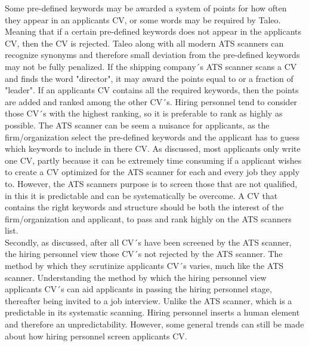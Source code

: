 Some pre-defined keywords may be awarded a system of points for how often they appear in an applicants CV, or some words may be required by Taleo.
Meaning that if a certain pre-defined keywords does not appear in the applicants CV, then the CV is rejected.
Taleo along with all modern ATS scanners can recognize synonyms and therefore small deviation from the pre-defined keywords may not be fully penalized.
If the shipping company´s ATS scanner scans a CV and finds the word "director", it may award the points equal to or a fraction of "leader".
If an applicants CV contains all the required keywords, then the points are added and ranked among the other CV´s.
Hiring personnel tend to consider those CV´s with the highest ranking, so it is preferable to rank as highly as possible.
The ATS scanner can be seem a nuisance for applicants, as the firm/organization select the pre-defined keywords and the applicant has to guess which keywords to include in there CV.
As discussed, most applicants only write one CV, partly because it can be extremely time consuming if a applicant wishes to create a CV optimized for the ATS scanner for each and every job they apply to.
However, the ATS scanners purpose is to screen those that are not qualified, in this it is predictable and can be systematically be overcome.
A CV that contains the right keywords and structure should be both the interest of the firm/organization and applicant, to pass and rank highly on the ATS scanners list. \\

Secondly, as discussed, after all CV´s have been screened by the ATS scanner, the hiring personnel view those CV´s not rejected by the ATS scanner.
The method by which they scrutinize applicants CV´s varies, much like the ATS scanner.
Understanding the method by which the hiring personnel view applicants CV´s can aid applicants in passing the hiring personnel stage, thereafter being invited to a job interview.
Unlike the ATS scanner, which is a predictable in its systematic scanning. 
Hiring personnel inserts a human element and therefore an unpredictability.
However, some general trends can still be made about how hiring personnel screen applicants CV. \\

